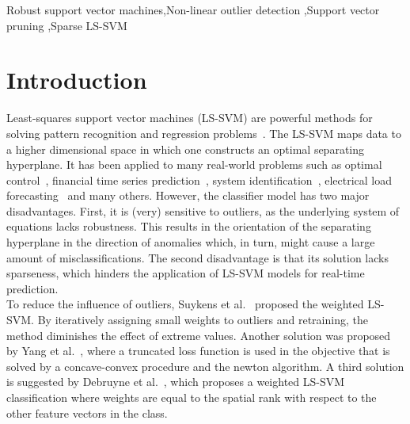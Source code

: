 \documentclass[preprint,12pt]{elsarticle}
\begin{document}
\begin{frontmatter}
\begin{abstract}
		\end{abstract}
		
		\begin{keyword}
			Robust support vector machines\sep Non-linear outlier detection \sep Support vector pruning \sep Sparse LS-SVM 
		\end{keyword}
	\end{frontmatter}
	
	
	\newpage
	
	\section{Introduction}
	
	Least-squares support vector machines (LS-SVM) are powerful methods for solving pattern recognition and regression problems~\cite{suykens2002least}. The LS-SVM maps data to a higher dimensional space in which one constructs an optimal separating hyperplane. It has been applied to many real-world problems such as optimal control~\cite{suykens2001optimal}, financial time series prediction~\cite{van2001financial}, system identification~\cite{goethals2005identification}, electrical load forecasting~\cite{espinoza2006fixed} and many others. However, the classifier model has two major disadvantages. First, it is (very) sensitive to outliers, as the underlying system of equations lacks robustness. This results in the orientation of the separating hyperplane in the direction of anomalies which, in turn, might cause a large amount of misclassifications. The second disadvantage is that its solution lacks sparseness, which hinders the application of LS-SVM models for real-time prediction. \\
	
	To reduce the influence of outliers, Suykens et al.~\cite{suykens2002weighted} proposed the weighted LS-SVM. By iteratively assigning small weights to outliers and retraining, the method diminishes the effect of extreme values. Another solution was proposed by Yang et al.~\cite{yang2014robust}, where a truncated loss function is used in the objective that is solved by a concave-convex procedure and the newton algorithm. A third solution is suggested by Debruyne et al.~\cite{debruyne2009robustified}, which proposes a weighted LS-SVM classification where weights are equal to the spatial rank with respect to the other feature vectors in the class.
	
\end{document}

